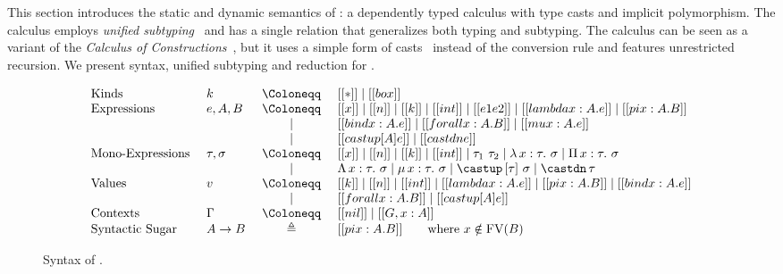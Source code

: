 \section{\System}
\label{sec:system}

This section introduces the static and dynamic semantics of
\name: a dependently typed calculus with type casts
and implicit polymorphism. The calculus employs
\emph{unified subtyping}~\cite{CoquandThierry1988Tcoc}
and has a single relation that generalizes both typing and subtyping.
The calculus can be seen as a variant of the \emph{Calculus of Constructions}~\cite{coc},
but it uses a simple form of casts~\cite{isotype,yang2019pure} instead of the
conversion rule and features unrestricted recursion.
We present syntax, unified subtyping and reduction for \name.

\begin{figure}[t]
\centering
\begin{equation*}
\begin{array}{llcl}
    \text{Kinds} & k & ~\Coloneqq ~ & [[*]] \mid [[box]] \\
    \text{Expressions} & e, A, B & ~ \Coloneqq ~ & [[x]] \mid [[n]] \mid [[k]] \mid [[int]] \mid [[e1 e2]] \mid [[lambda x : A. e]] \mid [[pi x : A. B]] \\
        & & \mid & [[bind x : A. e]] \mid [[forall x : A. B]] \mid [[mu x : A. e]] \\
        & & \mid & [[castup [A] e]] \mid [[castdn e]]   \\
    \text{Mono-Expressions} ~ & \tau, \sigma & ~ \Coloneqq ~ & [[x]] \mid [[n]] \mid [[k]] \mid [[int]] \mid \tau_1 ~ \tau_2 \mid \lambda \, x : \tau. ~ \sigma \mid \Pi \, x : \tau. ~ \sigma \\
        & & \mid & \Lambda \, x : \tau. ~ \sigma \mid \mu \, x : \tau. ~ \sigma \mid \castup \, [\tau]~ \sigma \mid \castdn \, \tau \\
    \text{Values} & v & ~ \Coloneqq ~ & [[k]] \mid [[n]] \mid [[int]] \mid [[lambda x : A. e]] \mid [[pi x : A. B]] \mid [[bind x : A. e]] \\
        & & \mid & [[forall x : A. B]] \mid [[castup [A] e]] \\
    \text{Contexts} & \Gamma & ~ \Coloneqq ~ & [[nil]] \mid [[G , x : A]] \\
    \text{Syntactic Sugar} ~ & A \rightarrow B & \triangleq & [[pi x : A. B]] \qquad \text{where} ~ x \notin \mathrm{FV}(B)
\end{array}
\end{equation*}
\caption{Syntax of \name.}
\label{fig:syntax}
\end{figure}
